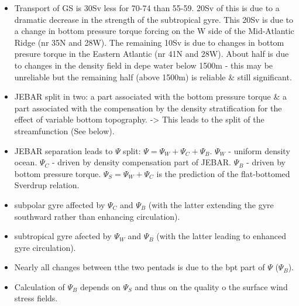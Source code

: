 \documentclass[..\Papers.tex]{subfiles}
\begin{document}
\begin{itemize}
    \item Transport of GS is 30Sv less for 70-74 than 55-59. 20Sv of this is due to a dramatic decrease in the strength of the subtropical gyre. This 20Sv is due to a change in bottom pressure torque forcing on the W side of the Mid-Atlantic Ridge (nr 35\degree N and 28\degree W). The remaining 10Sv is due to changes in bottom presure torque in the Eastern Atlantic (nr 41\degree N and 28\degree W). About half is due to changes in the density field in depe water below 1500m - this may be unreliable but the remaining half (above 1500m) is reliable \& still significant.
    \item JEBAR split in two: a part associated with the bottom pressure torque \& a part associated with the compensation by the density stratification for the effect of variable bottom topography. -> This leads to the split of the streamfunction (See below).
    \item JEBAR separation leads to $\Psi$ split: $\Psi = \Psi_W + \Psi_C + \Psi_B$. $\Psi_W$ - uniform density ocean. $\Psi_C$ - driven by density compensation part of JEBAR. $\Psi_B$ - driven by bottom pressure torque. $\Psi_S = \Psi_W+\Psi_C$ is the prediction of the flat-bottomed Sverdrup relation.
    \item subpolar gyre affected by $\Psi_C$ and $\Psi_B$ (with the latter extending the gyre southward rather than enhancing circulation).
    \item subtropical gyre afected by $\Psi_W$ and $\Psi_B$ (with the latter leading to enhanced gyre circulation).
    \item Nearly all changes between tthe two pentads is due to the bpt part of $\Psi$ ($\Psi_B$).
    \item Calculation of $\Psi_B$ depends on $\Psi_S$ and thus on the quality o the surface wind stress fields.
\end{itemize}
\end{document}
